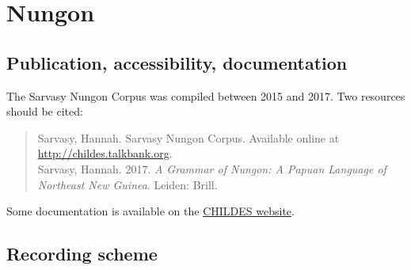 \documentclass[a4paper, 11pt]{book}
\begin{document}
%
%
%


\section{Nungon}
\label{sec:Nungon}

\subsection{Publication, accessibility, documentation}
The Sarvasy Nungon Corpus \citep{Sarvasy2017a, Sarvasy2017b} was compiled between 2015 and 2017. Two resources should be cited: 

\begin{quote}
	Sarvasy, Hannah. Sarvasy Nungon Corpus. Available online at \href{http://childes.talkbank.org/access/Other/Nungon/Sarvasy.html}{http://childes.talkbank.org}. \\ %
	Sarvasy, Hannah. 2017. \emph{A Grammar of Nungon: A Papuan Language of Northeast New Guinea}. Leiden: Brill. %
\end{quote}

Some documentation is available on the \href{http://childes.talkbank.org/access/Other/Nungon/Sarvasy.html}{CHILDES website}. 

\subsection{Recording scheme}
\end{document}
